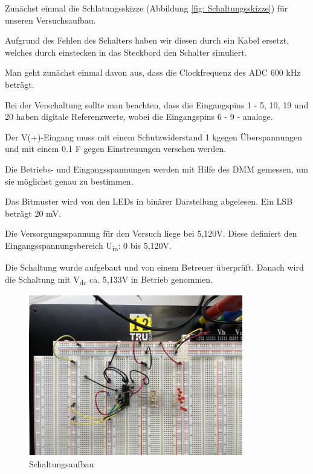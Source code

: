 Zunächst einmal die Schlatungsskizze (Abbildung \ref{fig: Schaltungsskizze}) für unseren Versuchsaufbau.

Aufgrund des Fehlen des Schalters haben wir diesen durch ein Kabel ersetzt, welches 
durch einstecken in das Steckbord den Schalter simuliert. \par

Man geht zunächst einmal davon aus, dass die Clockfrequenz des ADC 600 kHz beträgt.\par
Bei der Verschaltung sollte man beachten, dass die Eingangspins 1 - 5, 10, 19 und 20 
haben digitale Referenzwerte, wobei die Eingangspins 6 - 9 - analoge.\par
Der V(+)-Eingang muss mit einem Schutzwiderstand 1 k\textOmega  gegen Überspannungen 
und mit einem 0.1 \textmu F gegen Einstreuungen versehen werden. \par

Die Betriebs- und Eingangsspannungen werden mit Hilfe des \acs{DMM} gemessen, um sie möglichst 
genau zu bestimmen.\par
Das Bitmuster wird von den \acs{LED}s in binärer Darstellung abgelesen. Ein \acs{LSB} beträgt 20 mV.\par
Die Versorgungsspannung für den Versuch liege bei 5,120V. Diese definiert den 
Eingangsspannungsbereich U\textsubscript{in}: 0 bis 5,120V. \newline


Die Schaltung wurde aufgebaut und von einem Betreuer überprüft. Danach wird die Schaltung
mit V\textsubscript{dc} ca. 5,133V in Betrieb genommen. \par

\begin{figure}[H]
	\centering
	\includegraphics[height=7cm]{images/Schaltungsaufbau-versuch-eins.jpeg} 
	\caption[]{Schaltungsaufbau}
	\label{fig: Schaltungsaufbau}
\end{figure}


